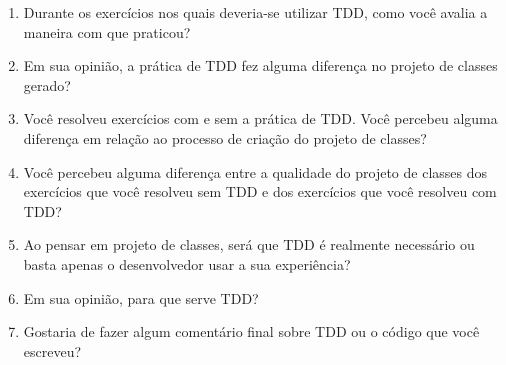 \begin{enumerate}
	
\item Durante os exercícios nos quais deveria-se utilizar TDD, como você avalia a maneira com que praticou?	

\item Em sua opinião, a prática de TDD fez alguma diferença no projeto de classes gerado?	

\item Você resolveu exercícios com e sem a prática de TDD. Você percebeu alguma diferença em relação ao processo de criação do projeto de classes?	

\item Você percebeu alguma diferença entre a qualidade do projeto de classes dos exercícios que você resolveu sem TDD e dos exercícios que você resolveu com TDD?	

\item Ao pensar em projeto de classes, será que TDD é realmente necessário ou basta apenas o desenvolvedor usar a sua experiência?	

\item Em sua opinião, para que serve TDD?	

\item Gostaria de fazer algum comentário final sobre TDD ou o código que você escreveu?	

\end{enumerate}
